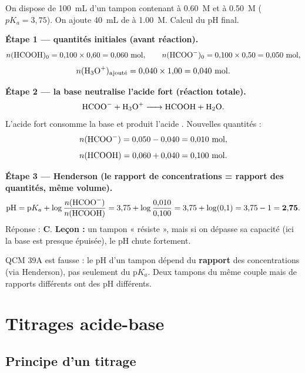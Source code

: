 \documentclass[11pt,a4paper]{article}
\begin{document}
\begin{exemple}
On dispose de \SI{100}{mL} d'un tampon contenant  à \SI{0,60}{M} et  à \SI{0,50}{M}
($pK_a = 3{,}75$). On ajoute \SI{40}{mL} de  à \SI{1,00}{M}. Calcul du pH final.

\smallskip
\textbf{Étape 1 — quantités initiales (avant réaction).}
\[ n(\ce{HCOOH})_0 = 0{,}100\times0{,}60 = 0{,}060\ \si{mol},\qquad
   n(\ce{HCOO-})_0 = 0{,}100\times0{,}50 = 0{,}050\ \si{mol}, \]
\[ n(\ce{H3O+})_{\text{ajouté}} = 0{,}040\times1{,}00 = 0{,}040\ \si{mol}. \]

\textbf{Étape 2 — la base  neutralise l'acide fort (réaction totale).}
\[ \ce{HCOO- + H3O+ -> HCOOH + H2O}. \]
L'acide fort consomme la base  et produit l'acide . Nouvelles quantités :
\[ n(\ce{HCOO-}) = 0{,}050 - 0{,}040 = 0{,}010\ \si{mol}, \]
\[ n(\ce{HCOOH}) = 0{,}060 + 0{,}040 = 0{,}100\ \si{mol}. \]

\textbf{Étape 3 — Henderson (le rapport de concentrations = rapport des quantités, même volume).}
\[ \mathrm{pH} = \mathrm{p}K_a + \log\frac{n(\ce{HCOO-})}{n(\ce{HCOOH})}
   = 3{,}75 + \log\frac{0{,}010}{0{,}100} = 3{,}75 + \log(0{,}1) = 3{,}75 - 1 = \mathbf{2{,}75}. \]
Réponse : \textbf{C}. \textbf{Leçon :} un tampon « résiste », mais si on dépasse sa capacité (ici la base
 est presque épuisée), le pH chute fortement.
\end{exemple}

\begin{remarque}
QCM 39A est fausse : le pH d'un tampon  dépend du \textbf{rapport} des concentrations
(via Henderson), pas seulement du $\mathrm{p}K_a$. Deux tampons du même couple mais de rapports différents
ont des pH différents.
\end{remarque}

\section{Titrages acide-base}

\subsection{Principe d'un titrage}
\end{document}
